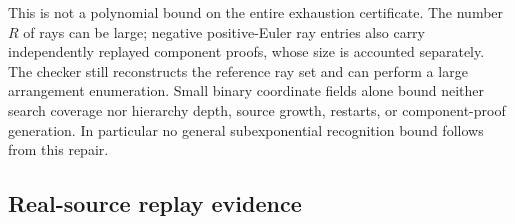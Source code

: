 This is not a polynomial bound on the entire exhaustion certificate.
The number $R$ of rays can be large; negative positive-Euler ray entries
also carry independently replayed component proofs, whose size is accounted
separately. The checker still reconstructs the reference ray set and can
perform a large arrangement enumeration. Small binary coordinate fields
alone bound neither search coverage nor hierarchy depth, source growth,
restarts, or component-proof generation. In particular no general
subexponential recognition bound follows from this repair.

\subsection{Real-source replay evidence}

